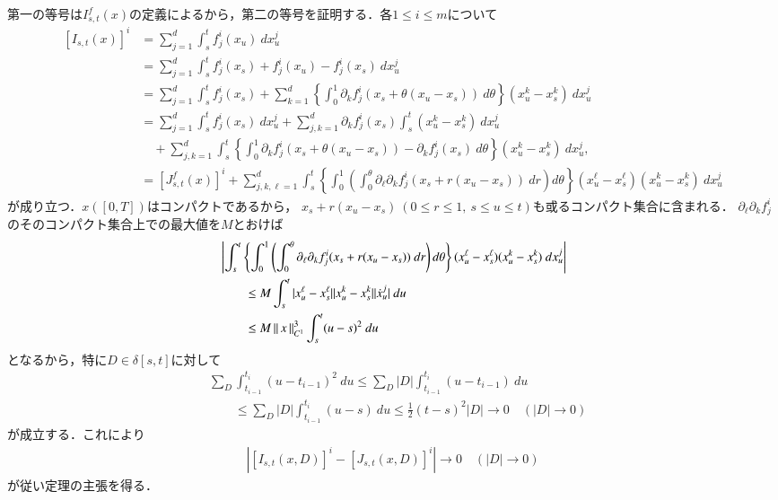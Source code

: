 	\begin{prf}
		第一の等号は$I^f_{s,t}(x)$の定義によるから，第二の等号を証明する．各$1 \leq i \leq m$について
		\begin{align}
			\left[ I_{s,t}(x) \right]^i
			&= \sum_{j=1}^d \int_s^t f_j^i(x_u)\ dx^j_u \\
			&= \sum_{j=1}^d \int_s^t f_j^i(x_s) + f_j^i(x_u) - f_j^i(x_s)\ dx^j_u \\
			&= \sum_{j=1}^d \int_s^t f_j^i(x_s) 
				+ \sum_{k=1}^d  \left\{ \int_0^1 \partial_k f_j^i(x_s + \theta(x_u - x_s))\ d\theta \right\} (x^k_u - x^k_s)\ dx^j_u \\
			&= \sum_{j=1}^d \int_s^t f_j^i(x_s)\ dx^j_u + \sum_{j,k=1}^d \partial_k f_j^i(x_s) \int_s^t (x^k_u - x^k_s)\ dx^j_u \\
				&\quad + \sum_{j,k=1}^d \int_s^t 
				\left\{ \int_0^1 \partial_k f_j^i(x_s + \theta(x_u - x_s)) - \partial_k f_j^i(x_s)\ d\theta \right\} (x^k_u - x^k_s)\ dx^j_u, \\
			&= \left[ J^f_{s,t}(x) \right]^i
				+ \sum_{j,k,\ell=1}^d \int_s^t 
				\left\{ \int_0^1 \left( \int_0^\theta \partial_\ell \partial_k f_j^i(x_s + r(x_u - x_s))\ dr\right) d\theta \right\} (x^\ell_u - x^\ell_s)(x^k_u - x^k_s)\ dx^j_u
		\end{align}
		が成り立つ．$x([0,T])$はコンパクトであるから，
		$x_s + r(x_u - x_s)\ (0 \leq r \leq 1,\ s \leq u \leq t)$も或るコンパクト集合に含まれる．
		$\partial_\ell \partial_k f_j^i$のそのコンパクト集合上での最大値を$M$とおけば
		\begin{align}
			&\left| \int_s^t 
				\left\{ \int_0^1 \left( \int_0^\theta \partial_\ell \partial_k f_j^i(x_s + r(x_u - x_s))\ dr\right) d\theta \right\} (x^\ell_u - x^\ell_s)(x^k_u - x^k_s)\ dx^j_u \right| \\
			&\qquad \leq M \int_s^t |x^\ell_u - x^\ell_s||x^k_u - x^k_s| |\dot{x}^j_u|\ du \\
			&\qquad \leq M \left\|\, x\, \right\|_{C^1}^3 \int_s^t (u - s)^2\ du
		\end{align}
		となるから，特に$D \in \delta[s,t]$に対して
		\begin{align}
			&\sum_D \int_{t_{i-1}}^{t_i} (u - t_{i-1})^2\ du
			\leq \sum_D |D| \int_{t_{i-1}}^{t_i} (u - t_{i-1})\ du \\
			&\qquad \leq \sum_D |D| \int_{t_{i-1}}^{t_i} (u - s)\ du
			\leq \frac{1}{2}(t-s)^2 |D|
			\longrightarrow 0 \quad (|D| \longrightarrow 0)
		\end{align}
		が成立する．これにより
		\begin{align}
			\left| \left[ I_{s,t}(x,D) \right]^i - \left[ J_{s,t}(x,D) \right]^i \right| \longrightarrow 0 \quad (|D| \longrightarrow 0)
		\end{align}
		が従い定理の主張を得る．
		\QED
	\end{prf}
	
	
	\begin{screen}
		\begin{thm}
		\end{thm}
	\end{screen}
	
	\begin{screen}
		\begin{thm}
		\end{thm}
	\end{screen}